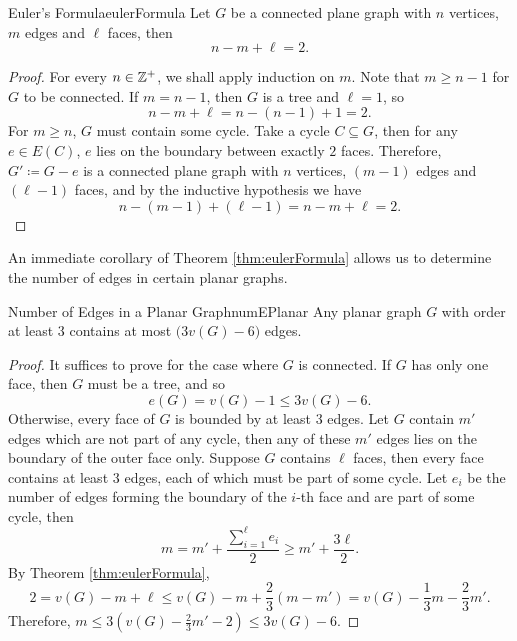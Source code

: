 \documentclass[math, code]{amznotes}
\theoremstyle{remark}
\begin{document}
\begin{thmbox}{Euler's Formula}{eulerFormula}
    Let $G$ be a connected plane graph with $n$ vertices, $m$ edges and $\ell$ faces, then 
    \begin{equation*}
        n - m + \ell = 2.
    \end{equation*}
    \tcblower
    \begin{proof}
        For every $n \in \mathbb{Z}^+$, we shall apply induction on $m$. Note that $m \geq n - 1$ for $G$ to be connected. If $m = n - 1$, then $G$ is a tree and $\ell = 1$, so 
        \begin{equation*}
            n - m + \ell = n - (n - 1) + 1 = 2.
        \end{equation*}
        For $m \geq n$, $G$ must contain some cycle. Take a cycle $C \subseteq G$, then for any $e \in E(C)$, $e$ lies on the boundary between exactly $2$ faces. Therefore, $G' \coloneqq G - e$ is a connected plane graph with $n$ vertices, $(m - 1)$ edges and $(\ell - 1)$ faces, and by the inductive hypothesis we have 
        \begin{equation*}
            n - (m - 1) + (\ell - 1) = n - m + \ell = 2.
        \end{equation*}
    \end{proof}
\end{thmbox}
An immediate corollary of Theorem \ref{thm:eulerFormula} allows us to determine the number of edges in certain planar graphs.
\begin{corbox}{Number of Edges in a Planar Graph}{numEPlanar}
    Any planar graph $G$ with order at least $3$ contains at most $\bigl(3v(G) - 6\bigr)$ edges.
    \tcblower
    \begin{proof}
        It suffices to prove for the case where $G$ is connected. If $G$ has only one face, then $G$ must be a tree, and so 
        \begin{equation*}
            e(G) = v(G) - 1 \leq 3v(G) - 6.
        \end{equation*}
        Otherwise, every face of $G$ is bounded by at least $3$ edges. Let $G$ contain $m'$ edges which are not part of any cycle, then any of these $m'$ edges lies on the boundary of the outer face only. Suppose $G$ contains $\ell$ faces, then every face contains at least $3$ edges, each of which must be part of some cycle. Let $e_i$ be the number of edges forming the boundary of the $i$-th face and are part of some cycle, then 
        \begin{equation*}
            m = m' + \frac{\sum_{i = 1}^{\ell}e_i}{2} \geq m' + \frac{3\ell}{2}.
        \end{equation*}
        By Theorem \ref{thm:eulerFormula}, 
        \begin{equation*}
            2 = v(G) - m + \ell \leq v(G) - m + \frac{2}{3}\left(m - m'\right) = v(G) - \frac{1}{3}m - \frac{2}{3}m'.
        \end{equation*}
        Therefore, $m \leq 3\left(v(G) - \frac{2}{3}m' - 2\right) \leq 3v(G) - 6$.
    \end{proof}
\end{corbox}
\end{document}
